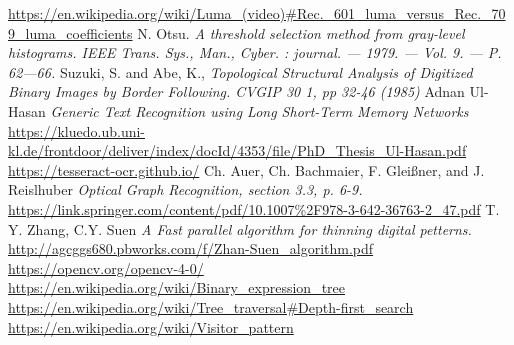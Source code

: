 \documentclass[makeidx, a4paper, 14pt]{extarticle}
\begin{document}
\begin{thebibliography}{}
     \url{https://en.wikipedia.org/wiki/Luma_(video)#Rec._601_luma_versus_Rec._709_luma_coefficients}
     N. Otsu.
        \textit{A threshold selection method from gray-level histograms. IEEE Trans. Sys., Man., Cyber. : journal. — 1979. — Vol. 9. — P. 62—66.}
     Suzuki, S. and Abe, K.,
        \textit{Topological Structural Analysis of Digitized Binary Images by Border Following. CVGIP 30 1, pp 32-46 (1985)}
     Adnan Ul-Hasan
        \textit{Generic Text Recognition using Long Short-Term Memory Networks}
        \url{https://kluedo.ub.uni-kl.de/frontdoor/deliver/index/docId/4353/file/PhD_Thesis_Ul-Hasan.pdf}    
        \url{https://tesseract-ocr.github.io/}
     Ch. Auer, Ch. Bachmaier, F. Gleißner, and J. Reislhuber
        \textit{Optical Graph Recognition, section 3.3, p. 6-9.}
        \url{https://link.springer.com/content/pdf/10.1007%2F978-3-642-36763-2_47.pdf}
      T. Y. Zhang, C.Y. Suen
        \textit{A Fast parallel algorithm for thinning digital petterns.}
        \url{http://agcggs680.pbworks.com/f/Zhan-Suen_algorithm.pdf}
        \url{https://opencv.org/opencv-4-0/}
        \url{https://en.wikipedia.org/wiki/Binary_expression_tree}
        \url{https://en.wikipedia.org/wiki/Tree_traversal#Depth-first_search}
        \url{https://en.wikipedia.org/wiki/Visitor_pattern}
    \end{thebibliography}
\end{document}
